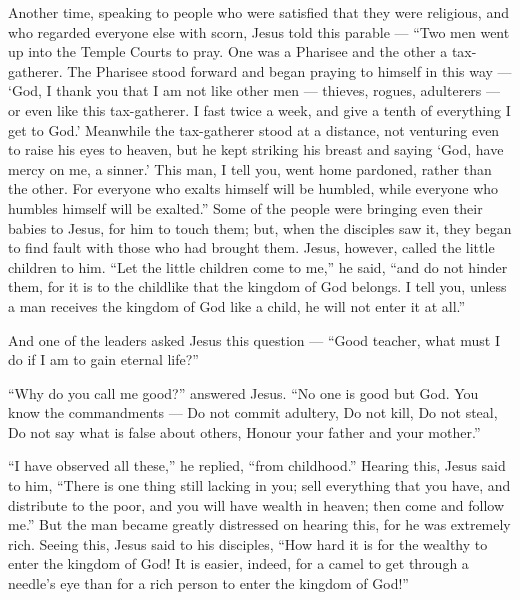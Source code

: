  Another time, speaking to people who were satisfied that
they were religious, and who regarded everyone else with scorn, Jesus
told this parable ---  ``Two men went up into the Temple
Courts to pray. One was a Pharisee and the other a tax-gatherer.
 The Pharisee stood forward and began praying to himself in
this way --- `God, I thank you that I am not like other men --- thieves,
rogues, adulterers --- or even like this tax-gatherer.  I
fast twice a week, and give a tenth of everything I get to God.'
 Meanwhile the tax-gatherer stood at a distance, not
venturing even to raise his eyes to heaven, but he kept striking his
breast and saying `God, have mercy on me, a sinner.'  This
man, I tell you, went home pardoned, rather than the other. For everyone
who exalts himself will be humbled, while everyone who humbles himself
will be exalted.''  Some of the people were bringing even
their babies to Jesus, for him to touch them; but, when the disciples
saw it, they began to find fault with those who had brought them.
 Jesus, however, called the little children to him. ``Let
the little children come to me,'' he said, ``and do not hinder them, for
it is to the childlike that the kingdom of God belongs.  I
tell you, unless a man receives the kingdom of God like a child, he will
not enter it at all.''

 And one of the leaders asked Jesus this question ---
``Good teacher, what must I do if I am to gain eternal life?''

 ``Why do you call me good?'' answered Jesus. ``No one is
good but God.  You know the commandments --- Do not commit
adultery, Do not kill, Do not steal, Do not say what is false about
others, Honour your father and your mother.''

 ``I have observed all these,'' he replied, ``from
childhood.''  Hearing this, Jesus said to him, ``There is
one thing still lacking in you; sell everything that you have, and
distribute to the poor, and you will have wealth in heaven; then come
and follow me.''  But the man became greatly distressed on
hearing this, for he was extremely rich.  Seeing this,
Jesus said to his disciples, ``How hard it is for the wealthy to enter
the kingdom of God!  It is easier, indeed, for a camel to
get through a needle's eye than for a rich person to enter the kingdom
of God!''

